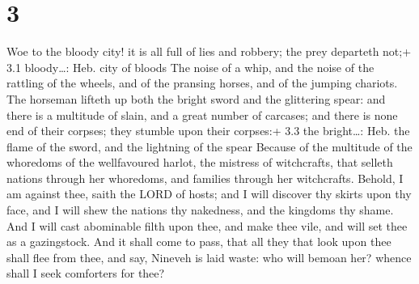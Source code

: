 \hypertarget{section-2}{%
\section{3}\label{section-2}}

 Woe to the bloody city! it is all full of lies and robbery;
the prey departeth not;+ 3.1 bloody\ldots: Heb. city of bloods
 The noise of a whip, and the noise of the rattling of the
wheels, and of the pransing horses, and of the jumping chariots.
 The horseman lifteth up both the bright sword and the
glittering spear: and there is a multitude of slain, and a great number
of carcases; and there is none end of their corpses; they stumble upon
their corpses:+ 3.3 the bright\ldots: Heb. the flame of the sword, and
the lightning of the spear  Because of the multitude of the
whoredoms of the wellfavoured harlot, the mistress of witchcrafts, that
selleth nations through her whoredoms, and families through her
witchcrafts.  Behold, I am against thee, saith the LORD of
hosts; and I will discover thy skirts upon thy face, and I will shew the
nations thy nakedness, and the kingdoms thy shame.  And I
will cast abominable filth upon thee, and make thee vile, and will set
thee as a gazingstock.  And it shall come to pass, that all
they that look upon thee shall flee from thee, and say, Nineveh is laid
waste: who will bemoan her? whence shall I seek comforters for thee?

